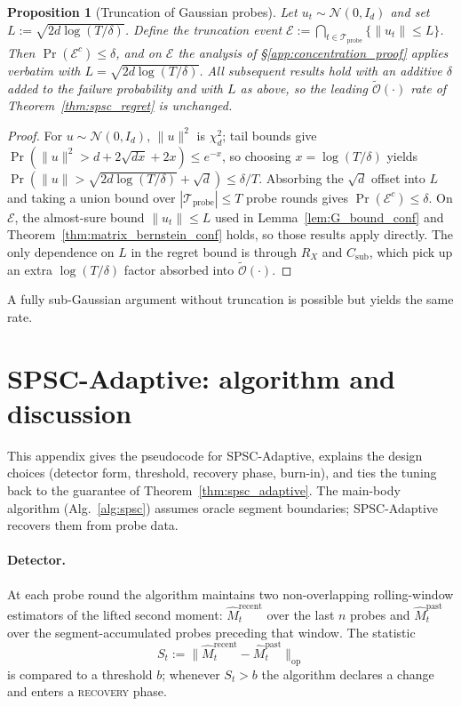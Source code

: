 \documentclass{article}
\newcommand{\op}{\mathrm{op}}
\newcommand{\cTprobe}{\mathcal{T}_{\mathrm{probe}}}
\newcommand{\cE}{\mathcal{E}}
\newcommand{\tilO}{\widetilde{\mathcal{O}}}
\newtheorem{proposition}{Proposition}
\begin{document}
\begin{proposition}[Truncation of Gaussian probes]
\label{prop:truncation}
Let $u_t\sim\mathcal N(0,I_d)$ and set $L := \sqrt{2d\log(T/\delta)}$.
Define the truncation event $\cE := \bigcap_{t\in\cTprobe}\{\|u_t\|\le L\}$.
Then $\Pr(\cE^c)\le\delta$, and on $\cE$ the analysis of
\S\ref{app:concentration_proof} applies verbatim with
$L = \sqrt{2d\log(T/\delta)}$. All subsequent results hold with an
additive $\delta$ added to the failure probability and with $L$ as
above, so the leading $\tilO(\cdot)$ rate of
Theorem~\ref{thm:spsc_regret} is unchanged.
\end{proposition}
\begin{proof}
For $u\sim\mathcal N(0,I_d)$, $\|u\|^2$ is $\chi^2_d$; tail bounds
\citep[Lem.~1]{laurent2000adaptive} give
$\Pr(\|u\|^2 > d + 2\sqrt{dx} + 2x)\le e^{-x}$, so choosing
$x = \log(T/\delta)$ yields $\Pr(\|u\|>\sqrt{2d\log(T/\delta)}
+\sqrt d)\le\delta/T$. Absorbing the $\sqrt d$ offset into $L$ and
taking a union bound over $|\cTprobe|\le T$ probe rounds gives
$\Pr(\cE^c)\le\delta$. On $\cE$, the almost-sure bound
$\|u_t\|\le L$ used in Lemma~\ref{lem:G_bound_conf} and
Theorem~\ref{thm:matrix_bernstein_conf} holds, so those results apply
directly. The only dependence on $L$ in the regret bound is through
$R_X$ and $C_{\mathrm{sub}}$, which pick up an extra
$\log(T/\delta)$ factor absorbed into $\tilO(\cdot)$.
\end{proof}

A fully sub-Gaussian argument without truncation is possible
\citep[cf.][]{tropp2015introduction} but yields the same rate.

\section{SPSC-Adaptive: algorithm and discussion}
\label{app:adaptive_algo}

This appendix gives the pseudocode for SPSC-Adaptive, explains the
design choices (detector form, threshold, recovery phase, burn-in),
and ties the tuning back to the guarantee of
Theorem~\ref{thm:spsc_adaptive}. The main-body algorithm
(Alg.~\ref{alg:spsc}) assumes oracle segment boundaries; SPSC-Adaptive
recovers them from probe data.

\paragraph{Detector.}
At each probe round the algorithm maintains two non-overlapping
rolling-window estimators of the lifted second moment:
$\widehat M_t^{\mathrm{recent}}$ over the last $n$ probes and
$\widehat M_t^{\mathrm{past}}$ over the segment-accumulated probes
preceding that window. The statistic
\begin{equation}
S_t := \bigl\|\widehat M_t^{\mathrm{recent}} - \widehat M_t^{\mathrm{past}}\bigr\|_\op
\label{eq:detector}
\end{equation}
is compared to a threshold $b$; whenever $S_t > b$ the algorithm
declares a change and enters a \textsc{recovery} phase.
\end{document}
